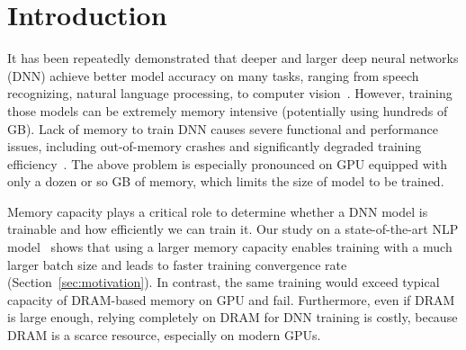 \section{Introduction}

\textcolor{check}{It has been repeatedly demonstrated that deeper and larger deep neural networks (DNN) achieve better model accuracy on many tasks, ranging from speech recognizing, natural language processing, to computer vision~\cite{radford2019language,devlin2018bert,he2015deep}.} However, training those models can be extremely memory intensive (potentially using hundreds of GB). 
Lack of memory to train DNN causes severe functional and performance issues, including out-of-memory crashes and  significantly degraded training efficiency~\cite{Wang:2018:SDG:3178487.3178491,Rhu:2016:VVD:3195638.3195660}. 
The above problem is especially pronounced on GPU equipped with only a dozen or so GB of memory, which limits the size of model to be trained.

Memory capacity plays a critical role to determine whether a DNN model is trainable and how efficiently we can train it. Our study on a state-of-the-art NLP model~\cite{devlin2018bert} shows that using %
a larger memory capacity enables training with %
\textcolor{check}{a much larger batch size and %
leads to faster training convergence rate %
(Section~\ref{sec:motivation})}. In contrast, the same training would exceed typical capacity of DRAM-based memory on GPU and fail. 
\textcolor{check}{Furthermore, even if DRAM is large enough, relying completely on DRAM for DNN training is costly, because DRAM is a scarce resource, especially on modern GPUs.}%

